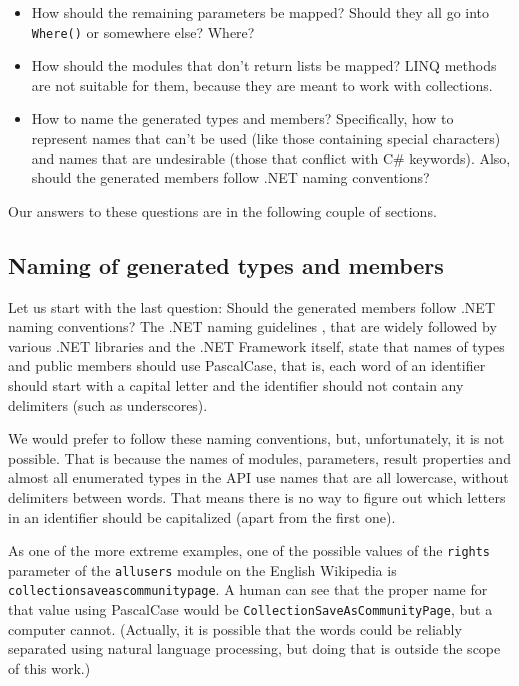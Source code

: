 \begin{itemize}
\item How should the remaining parameters be mapped?
Should they all go into \lstinline{Where()} or somewhere else? Where?
\item How should the modules that don't return lists be mapped?
\ac{LINQ} methods are not suitable for them, because they are meant to work with collections.
\item How to name the generated types and members?
Specifically, how to represent names that can't be used (like those containing special characters)
and names that are undesirable (those that conflict with C\# keywords).
Also, should the generated members follow .NET naming conventions?
\end{itemize}

Our answers to these questions are in the following couple of sections.

\subsection{Naming of generated types and members}

Let us start with the last question: Should the generated members follow .NET naming conventions?
The .NET naming guidelines \cite{guidelines-for-names},
that are widely followed by various .NET libraries and the .NET Framework itself,
state that names of types and public members should use PascalCase,
that is, each word of an identifier should start with a capital letter
and the identifier should not contain any delimiters (such as underscores).

We would prefer to follow these naming conventions, but, unfortunately, it is not possible.
That is because the names of modules, parameters, result properties and almost all enumerated types in the \ac{API}
use names that are all lowercase, without delimiters between words.
That means there is no way to figure out which letters in an identifier should be capitalized
(apart from the first one).

As one of the more extreme examples,
one of the possible values of the \texttt{rights} parameter
of the \texttt{allusers} module on the English Wikipedia is \texttt{collection\-save\-as\-community\-page}.
A human can see that the proper name for that value using PascalCase would be \lstinline{CollectionSaveAsCommunityPage},
but a computer cannot.
(Actually, it is possible that the words could be reliably separated using natural language processing,
but doing that is outside the scope of this work.)

